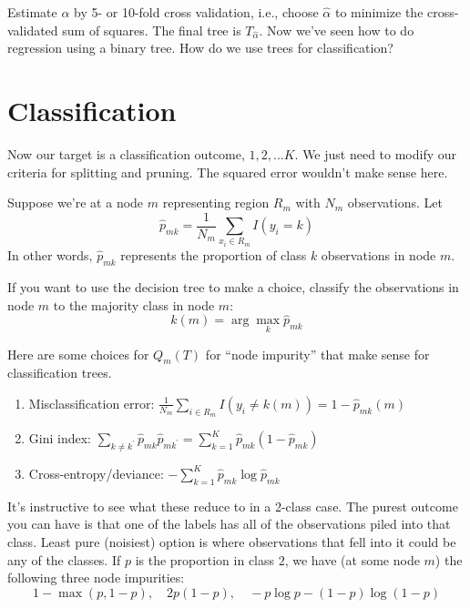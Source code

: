 \documentclass[a4paper]{article}
\begin{document}
Estimate $\alpha$ by 5- or 10-fold cross validation, i.e., choose $\hat{\alpha}$ to minimize the cross-validated sum of squares.  The final tree is $T_{\hat{\alpha}}$.  Now we've seen how to do regression using a binary tree.  How do we use trees for classification?

\section{Classification}

Now our target is a classification outcome, $1,2,...K$.  We just need to modify our criteria for splitting and pruning.  The squared error wouldn't make sense here.

Suppose we're at a node $m$ representing region $R_m$ with $N_m$ observations.  Let
$$
\hat{p}_{mk} = \frac{1}{N_m} \sum_{{x_i} \in R_m} I(y_i = k)
$$
In other words, $\hat{p}_{mk}$ represents the proportion of class $k$ observations in node $m$.

If you want to use the decision tree to make a choice, classify the observations in node $m$ to the majority class in node $m$:
$$
k(m) = \arg \max_k \hat{p}_{mk}
$$

Here are some choices for $Q_m(T)$ for ``node impurity'' that make sense for classification trees.
\begin{enumerate}
\item Misclassification error: $\frac{1}{N_m} \sum_{i \in R_m} I(y_i \neq k(m)) = 1-\hat{p}_{mk}(m)$
\item Gini index: $\sum_{k \neq k^\prime} \hat{p}_{mk} \hat{p}_{mk^\prime} = \sum_{k=1}^{K} \hat{p}_{mk}(1-\hat{p}_{mk})$
\item Cross-entropy/deviance: $-\sum_{k=1}^{K} \hat{p}_{mk} \log \hat{p}_{mk}$
\end{enumerate}

It's instructive to see what these reduce to in a 2-class case. The purest outcome you can have is that one of the labels has all of the observations piled into that class. Least pure (noisiest) option is where observations that fell into it could be any of the classes.  If $p$ is the proportion in class $2$, we have (at some node $m$) the following three node impurities:
$$
1-\max(p,1-p),\quad 2p(1-p),\quad -p\log p - (1-p) \log (1-p)
$$
\end{document}

